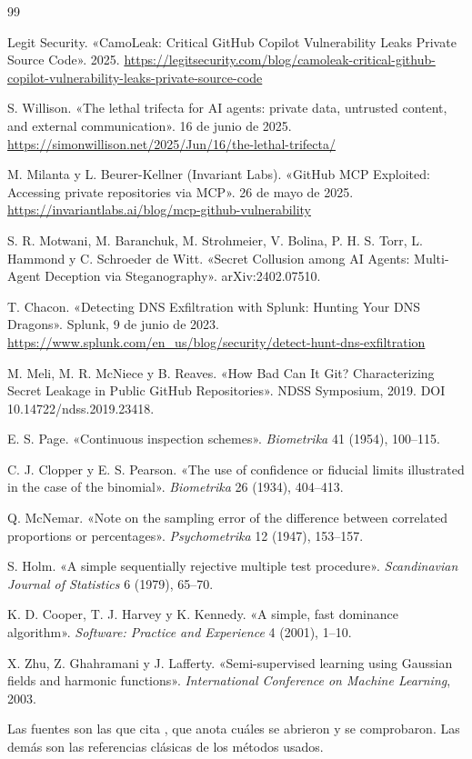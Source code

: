 \begin{thebibliography}{99}\small
{}

 Legit Security. «CamoLeak: Critical GitHub Copilot Vulnerability Leaks Private
  Source Code». 2025.
  \url{https://legitsecurity.com/blog/camoleak-critical-github-copilot-vulnerability-leaks-private-source-code}

 S. Willison. «The lethal trifecta for AI agents: private data, untrusted content,
  and external communication». 16 de junio de 2025.
  \url{https://simonwillison.net/2025/Jun/16/the-lethal-trifecta/}

 M. Milanta y L. Beurer-Kellner (Invariant Labs). «GitHub MCP Exploited: Accessing
  private repositories via MCP». 26 de mayo de 2025.
  \url{https://invariantlabs.ai/blog/mcp-github-vulnerability}

 S. R. Motwani, M. Baranchuk, M. Strohmeier, V. Bolina, P. H. S. Torr, L. Hammond y
  C. Schroeder de Witt. «Secret Collusion among AI Agents: Multi-Agent Deception via Steganography».
  arXiv:2402.07510.

 T. Chacon. «Detecting DNS Exfiltration with Splunk: Hunting Your DNS Dragons».
  Splunk, 9 de junio de 2023.
  \url{https://www.splunk.com/en_us/blog/security/detect-hunt-dns-exfiltration}

 M. Meli, M. R. McNiece y B. Reaves. «How Bad Can It Git? Characterizing Secret Leakage
  in Public GitHub Repositories». NDSS Symposium, 2019. DOI 10.14722/ndss.2019.23418.

 E. S. Page. «Continuous inspection schemes». \emph{Biometrika} 41 (1954), 100--115.

 C. J. Clopper y E. S. Pearson. «The use of confidence or fiducial limits illustrated
  in the case of the binomial». \emph{Biometrika} 26 (1934), 404--413.

 Q. McNemar. «Note on the sampling error of the difference between correlated
  proportions or percentages». \emph{Psychometrika} 12 (1947), 153--157.

 S. Holm. «A simple sequentially rejective multiple test procedure».
  \emph{Scandinavian Journal of Statistics} 6 (1979), 65--70.

 K. D. Cooper, T. J. Harvey y K. Kennedy. «A simple, fast dominance algorithm».
  \emph{Software: Practice and Experience} 4 (2001), 1--10.

 X. Zhu, Z. Ghahramani y J. Lafferty. «Semi-supervised learning using Gaussian fields and
  harmonic functions». \emph{International Conference on Machine Learning}, 2003.

\end{thebibliography}

{\small Las fuentes \cite{willison,invariant,motwani,splunk,meli} son las que cita
, que anota cuáles se abrieron y se comprobaron. Las demás son las
referencias clásicas de los métodos usados.}

